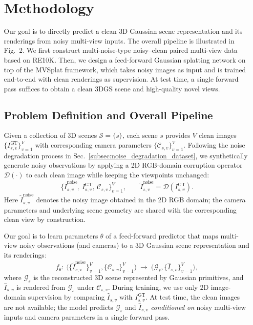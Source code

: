 \section{Methodology}
\label{sec:method}



Our goal is to directly predict a clean 3D Gaussian scene representation and its renderings from noisy multi-view inputs. The overall pipeline is illustrated in Fig.~2. We first construct multi-noise-type noisy--clean paired multi-view data based on RE10K. Then, we design a feed-forward Gaussian splatting network on top of the MVSplat framework, which takes noisy images as input and is trained end-to-end with clean renderings as supervision. At test time, a single forward pass suffices to obtain a clean 3DGS scene and high-quality novel views.

\subsection{Problem Definition and Overall Pipeline}
\label{subsec:problem_overview}

Given a collection of 3D scenes
\(
\mathcal{S} = \{s\}
\),
each scene \(s\) provides \(V\) clean images
\(
\{I^{\text{GT}}_{s,v}\}_{v=1}^{V}
\)
with corresponding camera parameters
\(
\{\mathcal{C}_{s,v}\}_{v=1}^{V}
\).
Following the noise degradation process in Sec.~\ref{subsec:noise_degradation_dataset}, we synthetically generate noisy observations by applying a 2D RGB-domain corruption operator \(\mathcal{D}(\cdot)\) to each clean image while keeping the viewpoints unchanged:
\begin{equation}
\bigl\{\tilde{I}^{\text{noise}}_{s,v},\, I^{\text{GT}}_{s,v},\, \mathcal{C}_{s,v}\bigr\}_{v=1}^{V},
\qquad
\tilde{I}^{\text{noise}}_{s,v}=\mathcal{D}\!\left(I^{\text{GT}}_{s,v}\right).
\end{equation}
Here \(\tilde{I}^{\text{noise}}_{s,v}\) denotes the noisy image obtained in the 2D RGB domain; the camera parameters and underlying scene geometry are shared with the corresponding clean view by construction.

Our goal is to learn parameters \(\theta\) of a feed-forward predictor that maps multi-view noisy observations (and cameras) to a 3D Gaussian scene representation and its renderings:
\begin{equation}
f_{\theta}:\ 
\bigl(\{\tilde{I}^{\text{noise}}_{s,v}\}_{v=1}^{V}, \{\mathcal{C}_{s,v}\}_{v=1}^{V}\bigr)
\;\longrightarrow\;
\bigl(\mathcal{G}_{s}, \{\hat{I}_{s,v}\}_{v=1}^{V}\bigr),
\end{equation}
where \(\mathcal{G}_{s}\) is the reconstructed 3D scene represented by Gaussian primitives, and \(\hat{I}_{s,v}\) is rendered from \(\mathcal{G}_{s}\) under \(\mathcal{C}_{s,v}\).
During training, we use only 2D image-domain supervision by comparing \(\hat{I}_{s,v}\) with \(I^{\text{GT}}_{s,v}\).
At test time, the clean images are not available; the model predicts \(\mathcal{G}_{s}\) and \(\hat{I}_{s,v}\) \emph{conditioned on} noisy multi-view inputs and camera parameters in a single forward pass.



